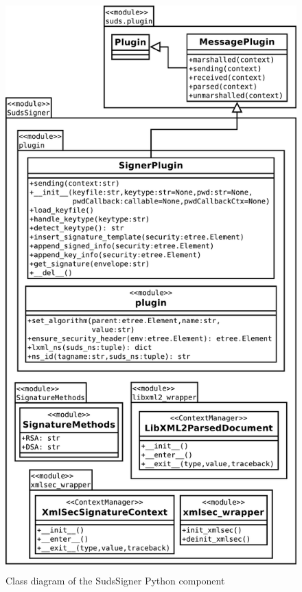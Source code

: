 \begin{figure}[htbp]
 \centering
 \includegraphics[height=22cm]{images/clsdSudsSigner.pdf}
 \caption{Class diagram of the SudsSigner Python component}
 \label{fig:clsdSudsSigner}
\end{figure}

